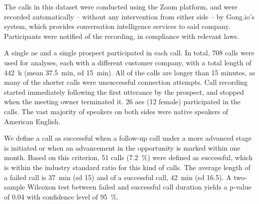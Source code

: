 The calls in this dataset were conducted using the Zoom platform, and were recorded automatically -- without any intervention from either side -- by Gong.io's system, which provides conversation intelligence services to said company.
Participants were notified of the recording, in compliance with relevant laws.

A single \ac{ae} and a single prospect participated in each call.
In total, 708 calls were used for analyses, each with a different customer company, with a total length of \SI{442}{\hour} (mean \SI{37.5}{\minute}, \ac{sd} \SI{15}{\minute}).
All of the calls are longer than 15 minutes, as many of the shorter calls were unsuccessful connection attempts.
Call recording started immediately following the first utterance by the prospect, and stopped when the meeting owner terminated it.
26 \acp{ae} (12 female) participated in the calls.
The vast majority of speakers on both sides were native speakers of American English.

We define a call as successful when a follow-up call under a more advanced stage is initiated or when an advancement in the opportunity is marked within one month.
Based on this criterion, 51 calls (\SI{7.2}{\percent}) were defined as successful, which is within the industry standard ratio for this kind of calls.
The average length of a failed call is \SI{37}{\minute} (\ac{sd} 15) and of a successful call, \SI{42}{\minute} (\ac{sd} 16.5).
A two-sample Wilcoxon test \cite{Wilcoxon1945individual} between failed and successful call duration yields a p-value of 0.04 with confidence level of \SI{95}{\percent}.

